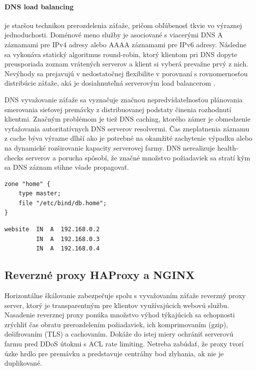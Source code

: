 \documentclass[12pt, a4paper]{article}
\begin{document}
\paragraph{DNS load balancing} je staršou technikou prerozdelenia záťaže, pričom obľúbenosť tkvie vo 
výraznej jednoduchosti. Doménové meno služby je asociované s viacerými DNS A záznamami pre IPv4 adresy 
alebo AAAA záznamami pre IPv6 adresy. Následne sa vykonáva statický algoritmus round-robin, ktorý
klientom pri DNS dopyte preusporiada zoznam vrátených serverov a klient si vyberá prevažne prvý z nich. 
Nevýhody sa prejavujú v nedostatočnej flexibilite v porovnaní s rovnomernosťou distribúcie záťaže, aká je 
dosiahnuteľná serverovým load balancerom \cite{server-load-balancing}. 

DNS vyvažovanie záťaže sa vyznačuje značnou nepredvídateľnosťou plánovania smerovania 
sieťovej premávky z distribuovanej podstaty činenia rozhodnutí klientmi. Značným problémom je tiež DNS 
caching, ktorého zámer je obmedzenie vyťažovania autoritatívnych DNS serverov resolvermi. Čas zneplatnenia 
záznamu z cache býva výrazne dlhší ako je potrebné na okamžité zachytenie výpadku alebo na dynamické 
rozširovanie kapacity serverovej farmy. DNS nerealizuje health-checks serverov a porucha spôsobí, že značné 
množstvo požiadaviek sa stratí kým sa DNS záznam stihne všade propagovať.

\noindent\begin{minipage}{.48\textwidth}
\begin{lstlisting}[caption=BIND9: nastavenie DNS zóny .home]
zone "home" {
    type master;
    file "/etc/bind/db.home";
}
\end{lstlisting}
\end{minipage}\hfill
\begin{minipage}{.48\textwidth}
\begin{lstlisting}[caption=Priradenie troch DNS A záznamov pre doménu website.home]
website  IN  A  192.168.0.2
         IN  A  192.168.0.3
         IN  A  192.168.0.4
\end{lstlisting}
\end{minipage}

\subsection{Reverzné proxy HAProxy a NGINX}
Horizontálne škálovanie zabezpečuje spolu s vyvažovaním záťaže reverzný proxy server, ktorý je 
transparentným pre klientov využívajúcich webovú službu. Nasadenie reverznej proxy ponúka množstvo výhod 
týkajúcich sa schopnosti zrýchliť čas obratu prerozdelením požiadaviek, ich komprimovaním (gzip), 
dešifrovaním (TLS) a cachovaním. Dokáže do istej miery ochrániť serverovú farmu pred DDoS útokmi s ACL rate 
limiting. Netreba zabúdať, že proxy tvorí úzke hrdlo pre premávku a predstavuje 
centrálny bod zlyhania, ak nie je duplikované.
\end{document}
